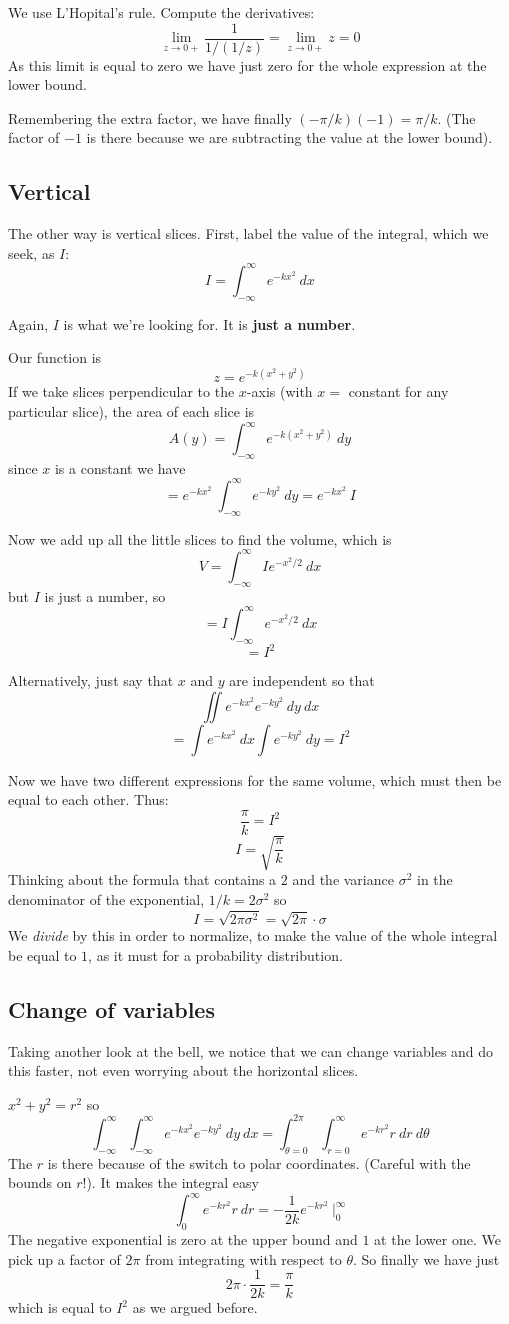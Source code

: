 \documentclass[11pt, oneside]{report}   	%
\begin{document}
We use L'Hopital's rule.  Compute the derivatives:
\[ \lim_{z \rightarrow 0+} \frac{1}{1/(1/z)} = \lim_{z \rightarrow 0+} z = 0 \]
As this limit is equal to zero we have just zero for the whole expression at the lower bound.

Remembering the extra factor, we have finally $(-\pi/k)(-1) = \pi/k$.  (The factor of $-1$ is there because we are subtracting the value at the lower bound).

\subsection*{Vertical}
The other way is vertical slices.  First, label the value of the integral, which we seek, as $I$:
\[ I = \int_{-\infty}^{\infty} e^{-kx^2} \ dx \]

Again, $I$ is what we're looking for.  It is \textbf{just a number}.  

Our function is
\[ z = e^{-k(x^2 + y^2)} \]
If we take slices perpendicular to the $x$-axis (with $x =$ constant for any particular slice), the area of each slice is
\[ A(y) = \int_{-\infty}^{\infty} e^{-k(x^2 + y^2)} \ dy \]
since  $x$ is a constant we have
\[ = e^{-kx^2} \ \int_{-\infty}^{\infty} e^{-ky^2} \ dy = e^{-kx^2} \ I \]

Now we add up all the little slices to find the volume, which is
\[  V =  \int_{-\infty}^{\infty} I e^{-x^2/2} \ dx \]
but $I$ is just a number, so
\[  =  I \int_{-\infty}^{\infty} e^{-x^2/2} \ dx \]
\[ = I^2 \]

Alternatively, just say that $x$ and $y$ are independent so that
\[ \iint e^{-kx^2} e^{-ky^2} \ dy \ dx \]
\[ = \int e^{-kx^2} \ dx \int e^{-ky^2} \ dy = I^2 \]

Now we have two different expressions for the same volume, which must then be equal to each other.  Thus:
\[ \frac{\pi}{k} = I^2 \]
\[ I = \sqrt{\frac{\pi}{k}} \]
Thinking about the formula that contains a $2$ and the variance $\sigma^2$ in the denominator of the exponential, $1/k = 2 \sigma^2$ so
\[ I = \sqrt{2 \pi \sigma^2 }   = \sqrt{2 \pi } \cdot \sigma \]
We \emph{divide} by this in order to normalize, to make the value of the whole integral be equal to $1$, as it must for a probability distribution.

\subsection*{Change of variables}
Taking another look at the bell, we notice that we can change variables and do this faster, not even worrying about the horizontal slices.

$x^2 + y^2 = r^2$ so
\[ \int_{-\infty}^{\infty} \int_{-\infty}^{\infty} e^{-kx^2} e^{-ky^2} \ dy \ dx = \int_{\theta = 0}^{2 \pi} \int_{r=0}^{\infty} e^{-kr^2} r \ dr \ d \theta \]
The $r$ is there because of the switch to polar coordinates.  (Careful with the bounds on $r$!).  It makes the integral easy
\[  \int_{0}^{\infty} e^{-kr^2} r \ dr  = -\frac{1}{2k} e^{-kr^2} \ \bigg |_0^{\infty} \]
The negative exponential is zero at the upper bound and $1$ at the lower one.  We pick up a factor of $2 \pi$ from integrating with respect to $\theta$.  So finally we have just
\[ 2 \pi \cdot \frac{1}{2k} = \frac{\pi}{k} \]
which is equal to $I^2$ as we argued before.
\end{document}
